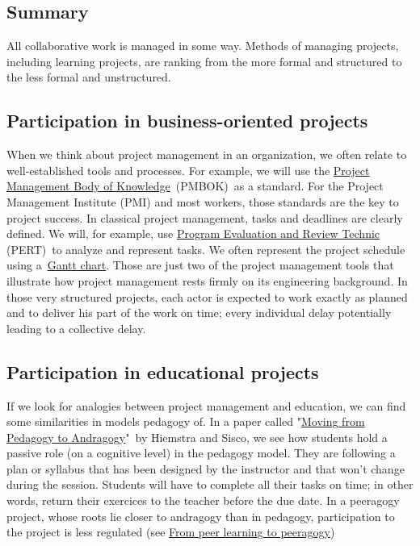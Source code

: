 \subsection{Summary}

All collaborative work is managed in some way. Methods of managing
projects, including learning projects, are ranking from the more formal
and structured to the less formal and unstructured.

\subsection{Participation in business-oriented projects}

When we think about project management in an organization, we often
relate to well-established tools and processes. For example, we will use
the \href{http://www.pmi.org/PMBOK-Guide-and-Standards.aspx}{Project
Management Body of Knowledge}~(PMBOK)~as a standard. For the Project
Management Institute (PMI) and most workers, those standards are the key
to project success. In classical project management, tasks and deadlines
are clearly defined. We will, for example, use
\href{http://en.wikipedia.org/wiki/PERT}{Program Evaluation and Review
Technic} (PERT)~to analyze and represent tasks. We often represent the
project schedule using
a~\href{http://en.wikipedia.org/wiki/Gantt\_chart}{Gantt chart}. Those
are just two of the project management tools that illustrate how project
management rests firmly on its engineering background. In those very
structured projects, each actor is expected to work exactly as planned
and to deliver his part of the work on time; every individual delay
potentially leading to a collective delay.

\subsection{Participation in educational projects}

If we look for analogies between project management and education, we
can find some similarities in models pedagogy of. In a paper called
"\href{http://www-distance.syr.edu/andraggy.html}{Moving from Pedagogy
to Andragogy}"~by Hiemstra and Sisco, we see how students hold a passive
role (on a cognitive level) in the pedagogy model. They are following a
plan or syllabus that has been designed by the instructor and that won't
change during the session. Students will have to complete all their
tasks on time; in other words, return their exercices to the teacher
before the due date. In a peeragogy project, whose roots lie closer to
andragogy than in pedagogy, participation to the project is less
regulated (see \href{http://peeragogy.org/to-peeragogy/}{From peer
learning to peeragogy})

